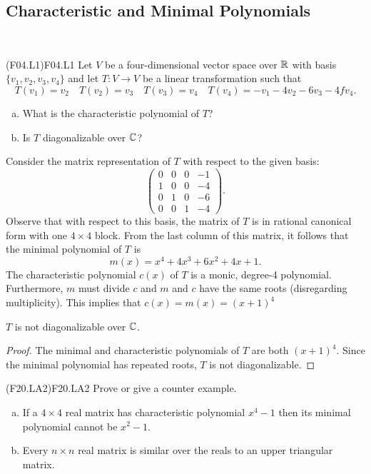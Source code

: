 \documentclass[../../AlgebraQualSolutions.tex]{subfiles}
\begin{document}
\subsection{Characteristic and Minimal Polynomials}
 

\begin{prob}{(F04.L1)}{F04.L1}
	Let $V$ be a four-dimensional vector space over $\mathbb{R}$ with basis $\{v_1,v_2,v_3,v_4\}$ and let $T: V \to V$ be a linear transformation such that
		\[T(v_1) = v_2 \quad T(v_2) = v_3 \quad T(v_3) = v_4 \quad T(v_4) = -v_1 -4v_2 -6v_3 - 4fv_4.\]
	\begin{enumerate}[(a)]
		\item What is the characteristic polynomial of $T$?
		\item Is $T$ diagonalizable over $\mathbb{C}$?
	\end{enumerate}
\end{prob}

\begin{solution}
	Consider the matrix representation of $T$ with respect to the given basis:
		\[\begin{pmatrix}
			0 & 0 & 0 & -1\\
			1 & 0 & 0 & -4\\
			0 & 1 & 0 & -6\\
			0 & 0 & 1 & -4 \end{pmatrix}.\]
		Observe that with respect to this basis, the matrix of $T$ is in rational canonical form with one $4 \times 4$ block. From the last column of this matrix, it follows that the minimal polynomial of $T$ is 
			\[m(x) = x^4 + 4x^3 + 6x^2 + 4x + 1.\]
		The characteristic polynomial $c(x)$ of $T$ is a monic, degree-4 polynomial. Furthermore, $m$ must divide $c$ and $m$ and $c$ have the same roots (disregarding multiplicity). This implies that $c(x) = m(x) = (x + 1)^4$
\end{solution}

\begin{claim}
	$T$ is not diagonalizable over $\mathbb{C}$.

	\begin{proof}
		The minimal and characteristic polynomials of $T$ are both $(x + 1)^4$. Since the minimal polynomial has repeated roots, $T$ is not diagonalizable.
	\end{proof}
\end{claim}

\begin{prob}{(F20.LA2)}{F20.LA2}
	Prove or give a counter example.
	\begin{enumerate}[(a)]
	\item If a $4 \times 4$ real matrix has characteristic polynomial $x^4 -1$ then its minimal polynomial cannot be $x^2 - 1$.
	\item Every $n \times n$ real matrix is similar over the reals to an upper triangular matrix.
	\end{enumerate}
	\end{prob}
	
\end{document}
